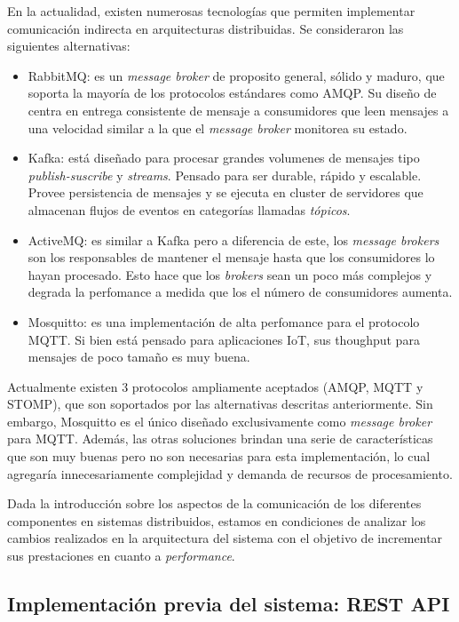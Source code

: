 \documentclass[a4paper,10pt, oneside]{article}
\begin{document}
En la actualidad, existen numerosas tecnologías que permiten implementar comunicación indirecta en arquitecturas distribuidas. Se consideraron las siguientes alternativas:

\begin{itemize}

	\item RabbitMQ: es un \textit{message broker} de proposito general, sólido y maduro, que soporta la mayoría de los protocolos estándares como AMQP. Su diseño de centra en entrega consistente de mensaje a consumidores que leen mensajes a una velocidad similar a la que el \textit{message broker} monitorea  su estado.
	\item Kafka: está diseñado para procesar grandes volumenes de mensajes tipo \textit{publish-suscribe} y \textit{streams}. Pensado para ser durable, rápido y escalable. Provee persistencia de mensajes y se ejecuta en cluster de servidores que almacenan flujos de eventos en categorías llamadas \textit{tópicos}.
	\item ActiveMQ: es similar a Kafka pero a diferencia de este, los \textit{message brokers} son los responsables de mantener el mensaje hasta que los consumidores lo hayan procesado. Esto hace que los \textit{brokers} sean un poco más complejos y degrada la perfomance a medida que los el número de consumidores aumenta.
	\item Mosquitto: es una implementación de alta perfomance para el protocolo MQTT. Si bien está pensado para aplicaciones IoT, sus thoughput para mensajes de poco tamaño es muy buena.

\end{itemize}

Actualmente existen 3 protocolos ampliamente aceptados (AMQP, MQTT y STOMP), que son soportados por las alternativas descritas anteriormente. Sin embargo, Mosquitto es el único diseñado exclusivamente como \textit{message broker} para MQTT. Además, las otras soluciones brindan una serie de características que son muy buenas pero no son necesarias para esta implementación, lo cual agregaría innecesariamente complejidad y demanda de recursos de procesamiento.

Dada la introducción sobre los aspectos de la comunicación de los diferentes componentes en sistemas distribuidos, estamos en condiciones de analizar los cambios realizados en la arquitectura del sistema con el objetivo de incrementar sus prestaciones en cuanto a \textit{performance}.

\subsection{Implementación previa del sistema: REST API}
\end{document}
